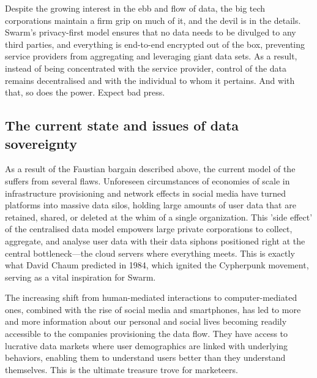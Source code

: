 Despite the growing interest in the ebb and flow of data, the big tech corporations maintain a firm grip on much of it, and the devil is in the details. Swarm's privacy-first model ensures that no data needs to be divulged to any third parties, and everything is end-to-end encrypted out of the box, preventing service providers from aggregating and leveraging giant data sets. As a result, instead of being concentrated with the service provider, control of the data remains decentralised and with the individual to whom it pertains. And with that, so does the power. Expect bad press.

\subsection{The current state and issues of data sovereignty \statusgreen }\label{sec:data-sovereignty}

As a result of the Faustian bargain described above, the current model of the  suffers from several flaws. Unforeseen circumstances of economies of scale in infrastructure provisioning and network effects in social media have turned platforms into massive data silos, holding large amounts of user data that are retained, shared, or deleted at the whim of a single organization. This 'side effect' of the centralised data model empowers large private corporations to collect, aggregate, and analyse user data with their data siphons positioned right at the central bottleneck—the cloud servers where everything meets. This is exactly what David Chaum predicted in 1984, which ignited the Cypherpunk movement, serving as a vital inspiration for Swarm.

The increasing shift from human-mediated interactions to computer-mediated ones, combined with the rise of social media and smartphones, has led to more and more information about our personal and social lives becoming readily accessible to the companies provisioning the data flow. They have access to lucrative data markets where user demographics are linked with underlying behaviors, enabling them to understand users better than they understand themselves. This is the ultimate treasure trove for marketeers.

